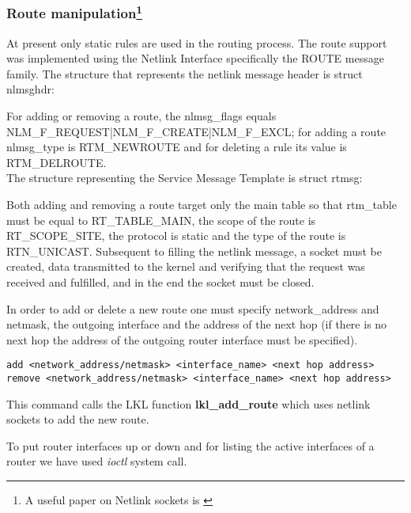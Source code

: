 {{\subsubsection[Route manipulation]{Route manipulation\footnote{A useful paper on Netlink sockets is \cite{netlinksockets}}}
At present only static rules are used in the routing process.
The route support was implemented using the Netlink Interface specifically the ROUTE message family.
The structure that represents the netlink message header is struct nlmsghdr:
\lstset{language=C, caption=Netlink Message Header Structure}

For adding or removing a route, the nlmsg_flags equals NLM_F_REQUEST|NLM_F_CREATE|NLM_F_EXCL; for adding a route nlmsg_type is RTM_NEWROUTE and for deleting a rule its value is RTM_DELROUTE.
\\
 
The structure representing the Service Message Template is struct rtmsg:
\lstset{language=C, caption=Service Message Template Structure}


Both adding and removing a route target only the main table so that rtm_table must be equal to RT_TABLE_MAIN, the scope of the route is RT_SCOPE_SITE, the protocol is static and the type of the route is RTN_UNICAST.
Subsequent to filling the netlink message, a socket must be created, data transmitted to the kernel and verifying that the request was received and fulfilled, and in the end the socket must be closed.

\lstset{language=C, caption=Communicating with the kernel}
  

In order to add or delete a new route one must specify network_address and netmask, the outgoing interface and 
the address of the next hop (if there is no next hop the address of the outgoing router interface must be specified).
\lstset{language=TeX,caption=Adding a new interface,label=lst:saddrule}
\begin{lstlisting}
add <network_address/netmask> <interface_name> <next hop address>
remove <network_address/netmask> <interface_name> <next hop address>
\end{lstlisting}  
This command calls the LKL function {\bf lkl_add_route} which uses netlink sockets to add the new route.

To put router interfaces up or down and for listing the active interfaces of a router we have used \textit{ioctl} system call.

}}
